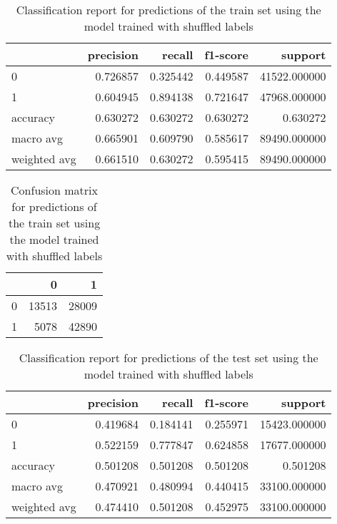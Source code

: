 \documentclass{article}
\begin{document}
{\begin{itemize}
\begin{table}[h!]
\centering
\begin{tabular}{lrrrr}
\toprule
{} &  precision &    recall &  f1-score &       support \\
\midrule
0            &   0.726857 &  0.325442 &  0.449587 &  41522.000000 \\
1            &   0.604945 &  0.894138 &  0.721647 &  47968.000000 \\
accuracy     &   0.630272 &  0.630272 &  0.630272 &      0.630272 \\
macro avg    &   0.665901 &  0.609790 &  0.585617 &  89490.000000 \\
weighted avg &   0.661510 &  0.630272 &  0.595415 &  89490.000000 \\
\bottomrule
\end{tabular}
\caption{Classification report for predictions of the train set using the model trained with shuffled labels}
\label{table:model1_tr_sh_cr}
\end{table}

\begin{table}[h!]
\centering
\begin{tabular}{lrr}
\toprule
{} &      0 &      1 \\
\midrule
0 &  13513 &  28009 \\
1 &   5078 &  42890 \\
\bottomrule
\end{tabular}

\caption{Confusion matrix for predictions of the train set using the model trained with shuffled labels}
\label{table:model1_tr_sh_cm}
\end{table}

\begin{table}[h!]
\centering
\begin{tabular}{lrrrr}
\toprule
{} &  precision &    recall &  f1-score &       support \\
\midrule
0            &   0.419684 &  0.184141 &  0.255971 &  15423.000000 \\
1            &   0.522159 &  0.777847 &  0.624858 &  17677.000000 \\
accuracy     &   0.501208 &  0.501208 &  0.501208 &      0.501208 \\
macro avg    &   0.470921 &  0.480994 &  0.440415 &  33100.000000 \\
weighted avg &   0.474410 &  0.501208 &  0.452975 &  33100.000000 \\
\bottomrule
\end{tabular}
\caption{Classification report for predictions of the test set using the model trained with shuffled labels}
\label{table:model1_te_sh_cr}
\end{table}
 

\end{itemize}}
\end{document}
